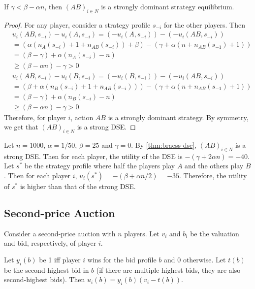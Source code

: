 \begin{theorem}
\label{thm:braess-dse}
If $\gamma < \beta - \alpha n$, then $(AB)_{i \in N}$ is a
strongly dominant strategy equilibrium.
\end{theorem}
\begin{proof}
For any player, consider a strategy profile $s_{-i}$ for the other players. Then
\begin{align*}
& u_i(AB, s_{-i}) - u_i(A, s_{-i})
= (-u_i(A, s_{-i})) - (-u_i(AB, s_{-i}))
\\ &= (\alpha(n_A(s_{-i}) + 1 + n_{AB}(s_{-i})) + \beta)
    - (\gamma + \alpha(n + n_{AB}(s_{-1}) + 1))
\\ &= (\beta - \gamma) + \alpha(n_A(s_{-i}) - n)
\\ &\ge (\beta - \alpha n) - \gamma > 0
\end{align*}
\begin{align*}
& u_i(AB, s_{-i}) - u_i(B, s_{-i})
= (-u_i(B, s_{-i})) - (-u_i(AB, s_{-i}))
\\ &= (\beta + \alpha(n_B(s_{-i}) + 1 + n_{AB}(s_{-i})))
    - (\gamma + \alpha(n + n_{AB}(s_{-1}) + 1))
\\ &= (\beta - \gamma) + \alpha(n_B(s_{-i}) - n)
\\ &\ge (\beta - \alpha n) - \gamma > 0
\end{align*}
Therefore, for player $i$, action $AB$ is a strongly dominant strategy.
By symmetry, we get that $(AB)_{i \in N}$ is a strong DSE.
\end{proof}

Let $n = 1000$, $\alpha = 1/50$, $\beta = 25$ and $\gamma = 0$.
By \cref{thm:braess-dse}, $(AB)_{i \in N}$ is a strong DSE.
Then for each player, the utility of the DSE is $-(\gamma + 2\alpha n) = -40$.
Let $s^*$ be the strategy profile where half the players play $A$ and the others play $B$.
Then for each player $i$, $u_i(s^*) = -(\beta + \alpha n/2) = -35$.
Therefore, the utility of $s^*$ is higher than that of the strong DSE.

\subsection{Second-price Auction}

Consider a second-price auction with $n$ players.
Let $v_i$ and $b_i$ be the valuation and bid, respectively, of player $i$.

Let $y_i(b)$ be 1 iff player $i$ wins for the bid profile $b$ and 0 otherwise.
Let $t(b)$ be the second-highest bid in $b$ (if there are multiple highest bids,
they are also second-highest bids).
Then $u_i(b) = y_i(b)(v_i - t(b))$.


